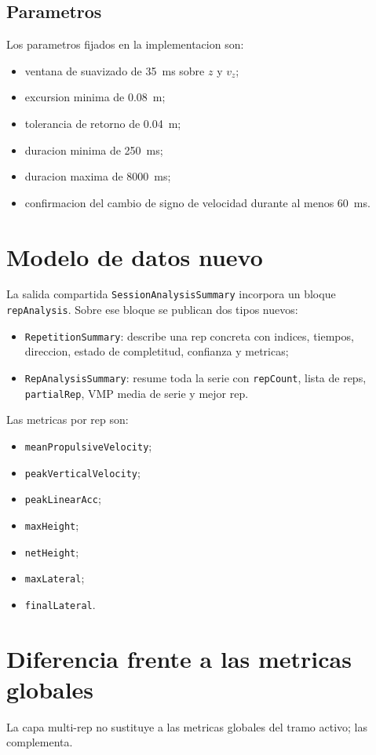 \documentclass[11pt,a4paper]{article}
\begin{document}
\subsection*{Parametros}
Los parametros fijados en la implementacion son:
\begin{itemize}[leftmargin=14pt]
  \item ventana de suavizado de \SI{35}{ms} sobre \(z\) y \(v_z\);
  \item excursion minima de \SI{0,08}{m};
  \item tolerancia de retorno de \SI{0,04}{m};
  \item duracion minima de \SI{250}{ms};
  \item duracion maxima de \SI{8000}{ms};
  \item confirmacion del cambio de signo de velocidad durante al menos \SI{60}{ms}.
\end{itemize}

\section{Modelo de datos nuevo}
La salida compartida \texttt{SessionAnalysisSummary} incorpora un bloque \texttt{repAnalysis}. Sobre ese bloque se publican dos tipos nuevos:
\begin{itemize}[leftmargin=14pt]
  \item \texttt{RepetitionSummary}: describe una rep concreta con indices, tiempos, direccion, estado de completitud, confianza y metricas;
  \item \texttt{RepAnalysisSummary}: resume toda la serie con \texttt{repCount}, lista de reps, \texttt{partialRep}, VMP media de serie y mejor rep.
\end{itemize}

Las metricas por rep son:
\begin{itemize}[leftmargin=14pt]
  \item \texttt{meanPropulsiveVelocity};
  \item \texttt{peakVerticalVelocity};
  \item \texttt{peakLinearAcc};
  \item \texttt{maxHeight};
  \item \texttt{netHeight};
  \item \texttt{maxLateral};
  \item \texttt{finalLateral}.
\end{itemize}

\section{Diferencia frente a las metricas globales}
La capa multi-rep no sustituye a las metricas globales del tramo activo; las complementa.
\end{document}
